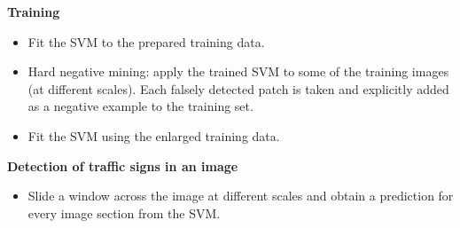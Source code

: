 \documentclass[a0paper,portrait]{baposter}
\begin{document}
\begin{poster}
{\textbf{Training}
\begin{itemize}
	\item Fit the SVM to the prepared training data.
	\item Hard negative mining: apply the trained SVM to some of the training images (at different scales). Each falsely detected patch is taken and explicitly added as a negative example to the training set.
	\item Fit the SVM using the enlarged training data.
\end{itemize}

\textbf{Detection of traffic signs in an image}
\begin{itemize}
	\item Slide a window across the image at different scales and obtain a prediction for every image section from the SVM.
\end{itemize}

}






\end{poster}
\end{document}
